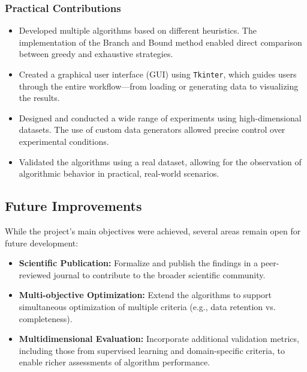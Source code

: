 \documentclass[a4paper,12pt]{article}
\begin{document}
\subsubsection{Practical Contributions}
\begin{itemize}
    \item Developed multiple algorithms based on different heuristics. The implementation of the Branch and Bound method enabled direct comparison between greedy and exhaustive strategies.
    
    \item Created a graphical user interface (GUI) using \texttt{Tkinter}, which guides users through the entire workflow—from loading or generating data to visualizing the results.
    
    \item Designed and conducted a wide range of experiments using high-dimensional datasets. The use of custom data generators allowed precise control over experimental conditions.
    
    \item Validated the algorithms using a real dataset, allowing for the observation of algorithmic behavior in practical, real-world scenarios.
\end{itemize}

\subsection{Future Improvements}
While the project's main objectives were achieved, several areas remain open for future development:
\begin{itemize}
    \item \textbf{Scientific Publication:} Formalize and publish the findings in a peer-reviewed journal to contribute to the broader scientific community.
    
    \item \textbf{Multi-objective Optimization:} Extend the algorithms to support simultaneous optimization of multiple criteria (e.g., data retention vs. completeness).
    
    \item \textbf{Multidimensional Evaluation:} Incorporate additional validation metrics, including those from supervised learning and domain-specific criteria, to enable richer assessments of algorithm performance.
\end{itemize}

\newpage
{}
\nocite{*}

\end{document}
